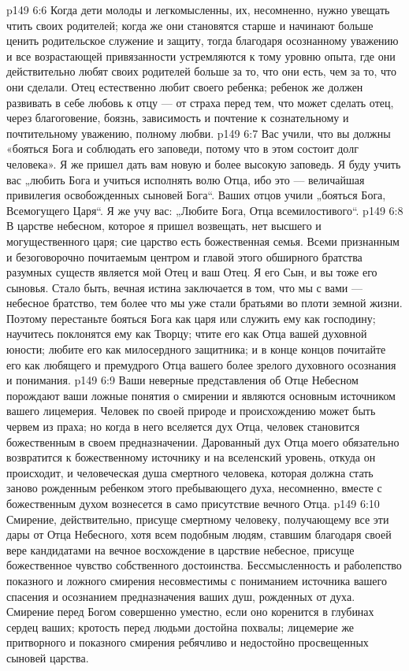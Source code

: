\vs p149 6:6 Когда дети молоды и легкомысленны, их, несомненно, нужно увещать чтить своих родителей; когда же они становятся старше и начинают больше ценить родительское служение и защиту, тогда благодаря осознанному уважению и все возрастающей привязанности устремляются к тому уровню опыта, где они действительно любят своих родителей больше за то, что они есть, чем за то, что они сделали. Отец естественно любит своего ребенка; ребенок же должен развивать в себе любовь к отцу --- от страха перед тем, что может сделать отец, через благоговение, боязнь, зависимость и почтение к сознательному и почтительному уважению, полному любви.
\vs p149 6:7 Вас учили, что вы должны «бояться Бога и соблюдать его заповеди, потому что в этом состоит долг человека». Я же пришел дать вам новую и более высокую заповедь. Я буду учить вас „любить Бога и учиться исполнять волю Отца, ибо это --- величайшая привилегия освобожденных сыновей Бога“. Ваших отцов учили „бояться Бога, Всемогущего Царя“. Я же учу вас: „Любите Бога, Отца всемилостивого“.
\vs p149 6:8 В царстве небесном, которое я пришел возвещать, нет высшего и могущественного царя; сие царство есть божественная семья. Всеми признанным и безоговорочно почитаемым центром и главой этого обширного братства разумных существ является мой Отец и ваш Отец. Я его Сын, и вы тоже его сыновья. Стало быть, вечная истина заключается в том, что мы с вами --- небесное братство, тем более что мы уже стали братьями во плоти земной жизни. Поэтому перестаньте бояться Бога как царя или служить ему как господину; научитесь поклонятся ему как Творцу; чтите его как Отца вашей духовной юности; любите его как милосердного защитника; и в конце концов почитайте его как любящего и премудрого Отца вашего более зрелого духовного осознания и понимания.
\vs p149 6:9 Ваши неверные представления об Отце Небесном порождают ваши ложные понятия о смирении и являются основным источником вашего лицемерия. Человек по своей природе и происхождению может быть червем из праха; но когда в него вселяется дух Отца, человек становится божественным в своем предназначении. Дарованный дух Отца моего обязательно возвратится к божественному источнику и на вселенский уровень, откуда он происходит, и человеческая душа смертного человека, которая должна стать заново рожденным ребенком этого пребывающего духа, несомненно, вместе с божественным духом вознесется в само присутствие вечного Отца.
\vs p149 6:10 Смирение, действительно, присуще смертному человеку, получающему все эти дары от Отца Небесного, хотя всем подобным людям, ставшим благодаря своей вере кандидатами на вечное восхождение в царствие небесное, присуще божественное чувство собственного достоинства. Бессмысленность и раболепство показного и ложного смирения несовместимы с пониманием источника вашего спасения и осознанием предназначения ваших душ, рожденных от духа. Смирение перед Богом совершенно уместно, если оно коренится в глубинах сердец ваших; кротость перед людьми достойна похвалы; лицемерие же притворного и показного смирения ребячливо и недостойно просвещенных сыновей царства.
